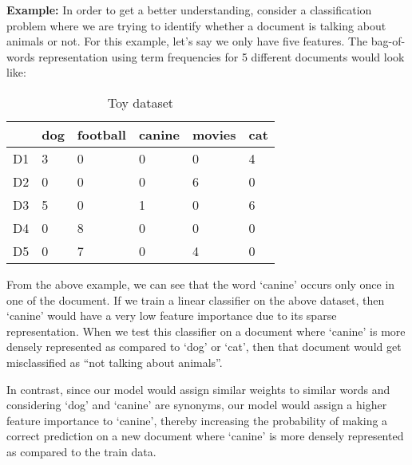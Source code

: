 \noindent \textbf{Example:} In order to get a better understanding, consider a classification problem where we are trying to identify whether a document is talking about animals or not. For this example, let's say we only have five features. The bag-of-words representation using term frequencies for 5 different documents would look like:

\begin{table}[htbp]
\centering
\begin{tabular}{l|lllll}
 & dog & \multicolumn{1}{c}{football} & \multicolumn{1}{c}{canine} & movies & cat \\\hline
D1 & 3 & 0 & 0 & 0 & 4 \\
D2 & 0 & 0 & 0 & 6 & 0 \\
D3 & 5 & 0 & 1 & 0 & 6 \\
D4 & 0 & 8 & 0 & 0 & 0 \\
D5 & 0 & 7 & 0 & 4 & 0
\end{tabular}
\caption{Toy dataset}
\end{table}

From the above example, we can see that the word ‘canine’ occurs only once in one of the document. If we train a linear classifier on the above dataset, then ‘canine’ would have a very low feature importance due to its sparse representation. When we test this classifier on a document where ‘canine’ is more densely represented as compared to ‘dog’ or ‘cat’, then that document would get misclassified as “not talking about animals”. 

In contrast, since our model would assign similar weights to similar words and considering ‘dog’ and ‘canine’ are synonyms, our model would assign a higher feature importance to ‘canine’, thereby increasing the probability of making a correct prediction on a new document where ‘canine’ is more densely represented as compared to the train data.